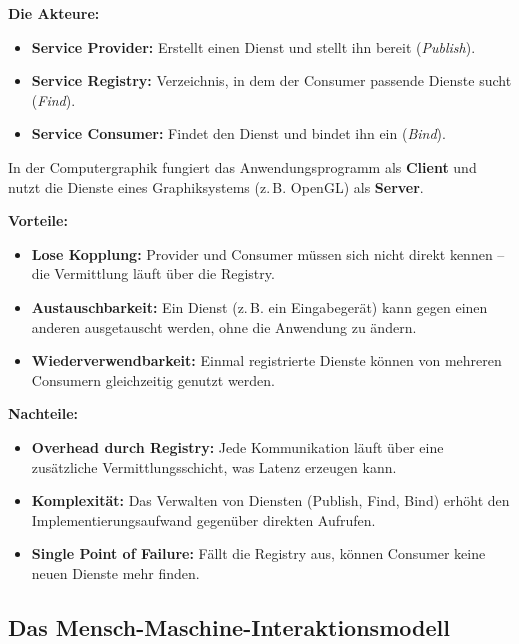 \documentclass[12pt, a4paper]{article}
\begin{document}
\textbf{Die Akteure:}
\begin{itemize}
  \item \textbf{Service Provider:} Erstellt einen Dienst und stellt ihn bereit
        (\textit{Publish}).
  \item \textbf{Service Registry:} Verzeichnis, in dem der Consumer passende
        Dienste sucht (\textit{Find}).
  \item \textbf{Service Consumer:} Findet den Dienst und bindet ihn ein
        (\textit{Bind}).
\end{itemize}

\begin{examplebox}
  In der Computergraphik fungiert das Anwendungsprogramm als \textbf{Client} und
  nutzt die Dienste eines Graphiksystems (z.\,B. OpenGL) als \textbf{Server}.
\end{examplebox}

\textbf{Vorteile:}
\begin{itemize}
  \item \textbf{Lose Kopplung:} Provider und Consumer müssen sich nicht direkt
        kennen -- die Vermittlung läuft über die Registry.
  \item \textbf{Austauschbarkeit:} Ein Dienst (z.\,B. ein Eingabegerät) kann
        gegen einen anderen ausgetauscht werden, ohne die Anwendung zu ändern.
  \item \textbf{Wiederverwendbarkeit:} Einmal registrierte Dienste können von
        mehreren Consumern gleichzeitig genutzt werden.
\end{itemize}

\textbf{Nachteile:}
\begin{itemize}
  \item \textbf{Overhead durch Registry:} Jede Kommunikation läuft über eine
        zusätzliche Vermittlungsschicht, was Latenz erzeugen kann.
  \item \textbf{Komplexität:} Das Verwalten von Diensten (Publish, Find, Bind)
        erhöht den Implementierungsaufwand gegenüber direkten Aufrufen.
  \item \textbf{Single Point of Failure:} Fällt die Registry aus, können
        Consumer keine neuen Dienste mehr finden.
\end{itemize}

\subsection{Das Mensch-Maschine-Interaktionsmodell}
\end{document}
